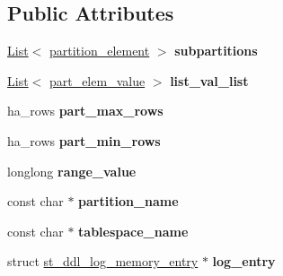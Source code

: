 \subsection*{Public Attributes}
\begin{DoxyCompactItemize}
\item 
\mbox{\label{classpartition__element_a5d8e0963791691fad66d45fc3f004b8f}} 
\mbox{\hyperlink{classList}{List}}$<$ \mbox{\hyperlink{classpartition__element}{partition\+\_\+element}} $>$ {\bfseries subpartitions}
\item 
\mbox{\label{classpartition__element_a11d6e9dc91822ed0bb67d0e7c2b89622}} 
\mbox{\hyperlink{classList}{List}}$<$ \mbox{\hyperlink{structp__elem__val}{part\+\_\+elem\+\_\+value}} $>$ {\bfseries list\+\_\+val\+\_\+list}
\item 
\mbox{\label{classpartition__element_ad88aa2843e9a760615f9ecabd248b86e}} 
ha\+\_\+rows {\bfseries part\+\_\+max\+\_\+rows}
\item 
\mbox{\label{classpartition__element_aa0550895ee34a2b35154f56d3aa1706a}} 
ha\+\_\+rows {\bfseries part\+\_\+min\+\_\+rows}
\item 
\mbox{\label{classpartition__element_a97e0154390c1471c9446888d4fa14df2}} 
longlong {\bfseries range\+\_\+value}
\item 
\mbox{\label{classpartition__element_a61de080484b2d8f5611505e3e7dfb17c}} 
const char $\ast$ {\bfseries partition\+\_\+name}
\item 
\mbox{\label{classpartition__element_aeaf6fd8f384ea145655f48353d1cc346}} 
const char $\ast$ {\bfseries tablespace\+\_\+name}
\item 
\mbox{\label{classpartition__element_abf283abc629ff6751ea58381a3e8ff90}} 
struct \mbox{\hyperlink{structst__ddl__log__memory__entry}{st\+\_\+ddl\+\_\+log\+\_\+memory\+\_\+entry}} $\ast$ {\bfseries log\+\_\+entry}
\item 
\mbox{\label{classpartition__element_a3c974a1c9f47932b334bbe426011b2ed}} 

\end{DoxyCompactItemize}

